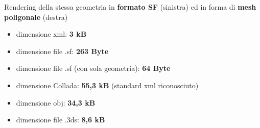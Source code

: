 \documentclass[ignorenonframetext,8pt]{beamer}
\begin{document}
\begin{frame}
\begin{block}{Rendering della stessa geometria in \textbf{formato SF} (sinistra) ed in forma di \textbf{mesh poligonale} (destra)}
\begin{center}
\begin{minipage}[c]{.45\textwidth}
\begin{figure}
					\end{figure}
				\end{minipage}
			\end{center}
			\begin{center}
				\begin{minipage}[c]{.45\textwidth}
					\begin{itemize}
						\item dimensione xml: \textbf{3 kB}
						\item dimensione file .sf: \textbf{263 Byte}
						\item dimensione file .sf (con sola geometria): \textbf{64 Byte}
					\end{itemize}
				\end{minipage}
				\begin{minipage}[c]{.45\textwidth}
					\begin{itemize}
						\item dimensione Collada: \textbf{55,3 kB} (standard xml riconosciuto)
						\item dimensione obj: \textbf{34,3 kB}
						\item dimensione file .3ds: \textbf{8,6 kB}
					\end{itemize}
				\end{minipage}
			\end{center}
		\end{block}
	\end{frame}
\end{document}
